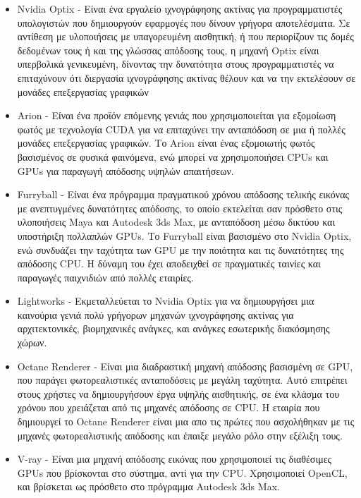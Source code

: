 \begin{itemize}
\item Nvidia Optix - Είναι ένα εργαλείο ιχνογράφησης ακτίνας για προγραμματιστές υπολογιστών που δημιουργούν εφαρμογές που δίνουν γρήγορα αποτελέσματα. Σε αντίθεση με υλοποιήσεις με υπαγορευμένη αισθητική, ή που περιορίζουν τις δομές δεδομένων τους ή και της γλώσσας απόδοσης τους, η μηχανή Optix είναι υπερβολικά γενικευμένη, δίνοντας την δυνατότητα στους προγραμματιστές να επιταχύνουν ότι διεργασία ιχνογράφησης ακτίνας θέλουν και να την εκτελέσουν σε μονάδες επεξεργασίας γραφικών
\item Arion -  Eίναι ένα προϊόν επόμενης γενιάς που χρησιμοποιείται για εξομοίωση φωτός με τεχνολογία CUDA για να επιταχύνει την ανταπόδοση σε μια ή πολλές μονάδες επεξεργασίας γραφικών. Το Arion είναι ένας εξομοιωτής φωτός βασισμένος σε φυσικά φαινόμενα, ενώ μπορεί να χρησιμοποιήσει CPUs και GPUs για παραγωγή απόδοσης υψηλών απαιτήσεων.
\item Furryball - Είναι ένα πρόγραμμα πραγματικού χρόνου απόδοσης τελικής εικόνας με ανεπτυγμένες δυνατότητες απόδοσης, το οποίο εκτελείται σαν πρόσθετο στις υλοποιήσεις Maya και Autodesk 3ds Max, με ανταπόδοση μέσω δικτύου και υποστήριξη πολλαπλών GPUs. Το Furryball είναι βασισμένο στο Nvidia Optix, ενώ συνδυάζει την ταχύτητα των GPU με την ποιότητα και τις δυνατότητες της απόδοσης CPU. Η δύναμη του έχει αποδειχθεί σε πραγματικές ταινίες και παραγωγές παιχνιδιών από πολλές εταιρίες.
\item Lightworks - Εκμεταλλεύεται το Nvidia Optix για να δημιουργήσει μια καινούρια γενιά πολύ γρήγορων μηχανών ιχνογράφησης ακτίνας για αρχιτεκτονικές, βιομηχανικές ανάγκες, και ανάγκες εσωτερικής διακόσμησης χώρων.
\item Octane Renderer - Είναι μια διαδραστική μηχανή απόδοσης βασισμένη σε GPU, που παράγει φωτορεαλιστικές ανταποδόσεις με μεγάλη ταχύτητα. Αυτό επιτρέπει στους χρήστες να δημιουργήσουν έργα υψηλής αισθητικής, σε ένα κλάσμα του χρόνου που χρειάζεται από τις μηχανές απόδοσης σε CPU. Η εταιρία που δημιουργεί το Octane Renderer είναι μια απο τις πρώτες που ασχολήθηκαν με τις μηχανές φωτορεαλιστικής απόδοσης και έπαιξε μεγάλο ρόλο στην εξέλιξη τους.
\item V-ray - Είναι μια μηχανή απόδοσης εικόνας που χρησιμοποιεί τις διαθέσιμες GPUs που βρίσκονται στο σύστημα, αντί για την CPU. Χρησιμοποιεί OpenCL, και βρίσκεται ως πρόσθετο στο πρόγραμμα Autodesk 3ds Max.
\end{itemize}



